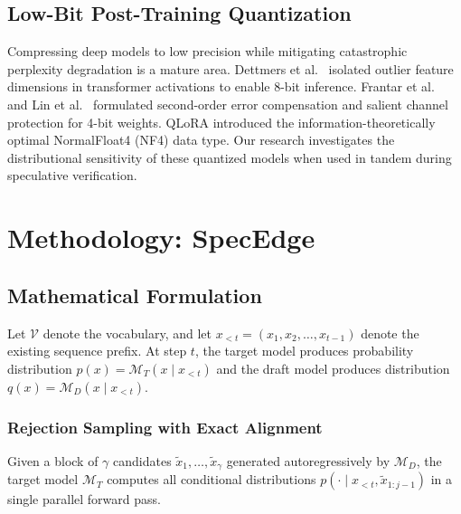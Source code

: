 \documentclass[10pt,twocolumn,letterpaper]{article}
\begin{document}
\subsection{Low-Bit Post-Training Quantization}
Compressing deep models to low precision while mitigating catastrophic perplexity degradation is a mature area. Dettmers et al.~\cite{dettmers2022llm} isolated outlier feature dimensions in transformer activations to enable 8-bit inference. Frantar et al.~\cite{frantar2023gptq} and Lin et al.~\cite{lin2024awq} formulated second-order error compensation and salient channel protection for 4-bit weights. QLoRA \cite{dettmers2023qlora} introduced the information-theoretically optimal NormalFloat4 (NF4) data type. Our research investigates the distributional sensitivity of these quantized models when used in tandem during speculative verification.

\section{Methodology: SpecEdge}

\subsection{Mathematical Formulation}
Let $\mathcal{V}$ denote the vocabulary, and let $x_{<t} = (x_1, x_2, \dots, x_{t-1})$ denote the existing sequence prefix. At step $t$, the target model produces probability distribution $p(x) = \mathcal{M}_T(x \mid x_{<t})$ and the draft model produces distribution $q(x) = \mathcal{M}_D(x \mid x_{<t})$.

\subsubsection{Rejection Sampling with Exact Alignment}
Given a block of $\gamma$ candidates $\tilde{x}_1, \dots, \tilde{x}_\gamma$ generated autoregressively by $\mathcal{M}_D$, the target model $\mathcal{M}_T$ computes all conditional distributions $p(\cdot \mid x_{<t}, \tilde{x}_{1:j-1})$ in a single parallel forward pass.
\end{document}
